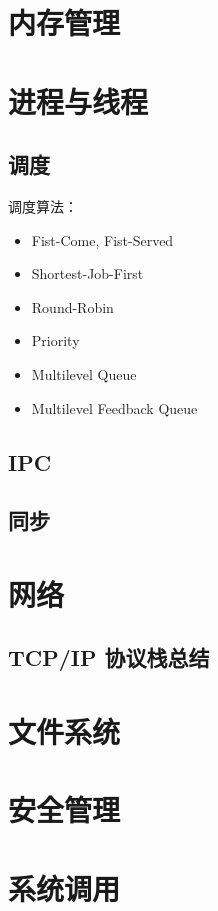 \section{内存管理}

\section{进程与线程}

\subsection{调度}

调度算法：
\begin{itemize}
  \item Fist-Come, Fist-Served
  \item Shortest-Job-First
  \item Round-Robin
  \item Priority
  \item Multilevel Queue
  \item Multilevel Feedback Queue
\end{itemize}

\subsection{IPC}

\subsection{同步}

\section{网络}
\subsection{TCP/IP 协议栈总结}

\section{文件系统}

\section{安全管理}

\section{系统调用}

